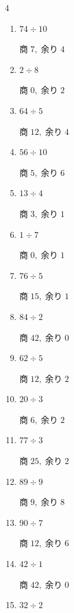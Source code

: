\begin{multicols}{4}
\begin{enumerate}
        $商\; 29,\; 余り\; 1$

  \item $74 \div 10$

        $商\; 7,\; 余り\; 4$

  \item $2 \div 8$

        $商\; 0,\; 余り\; 2$

  \item $64 \div 5$

        $商\; 12,\; 余り\; 4$

  \item $56 \div 10$

        $商\; 5,\; 余り\; 6$

  \item $13 \div 4$

        $商\; 3,\; 余り\; 1$

  \item $1 \div 7$

        $商\; 0,\; 余り\; 1$

\columnbreak %

  \item $76 \div 5$

        $商\; 15,\; 余り\; 1$

  \item $84 \div 2$

        $商\; 42,\; 余り\; 0$

  \item $62 \div 5$

        $商\; 12,\; 余り\; 2$

  \item $20 \div 3$

        $商\; 6,\; 余り\; 2$

  \item $77 \div 3$

        $商\; 25,\; 余り\; 2$

  \item $89 \div 9$

        $商\; 9,\; 余り\; 8$

  \item $90 \div 7$

        $商\; 12,\; 余り\; 6$

  \item $42 \div 1$

        $商\; 42,\; 余り\; 0$

  \item $32 \div 2$


\end{enumerate}
\end{multicols}
